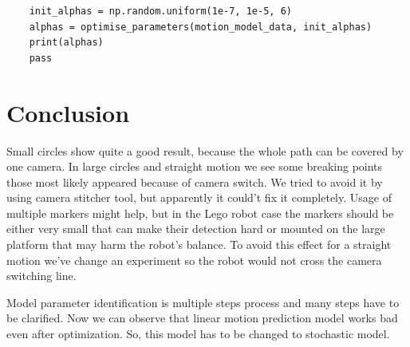 \documentclass[a4paper, 12pt]{article}
\begin{document}
\begin{lstlisting}
    init_alphas = np.random.uniform(1e-7, 1e-5, 6)
    alphas = optimise_parameters(motion_model_data, init_alphas)
    print(alphas)
    pass
\end{lstlisting}




\section{Conclusion}

Small circles show quite a good result, because the whole path can be covered by one camera. In large circles and straight motion we see some breaking points those most likely appeared because of camera switch. We tried to avoid it by using camera stitcher tool, but apparently it could't fix it completely. Usage of multiple markers might help, but in the Lego robot case the markers should be either very small that can make their detection hard or mounted on the large platform that may harm the robot's balance. To avoid this effect for a straight motion we've change an experiment so the robot would not cross the camera switching line.

\bigskip

Model parameter identification is multiple steps process and many steps have to be clarified. Now we can observe that linear motion prediction model works bad even after optimization. So, this model has to be changed to stochastic model.
\end{document}
